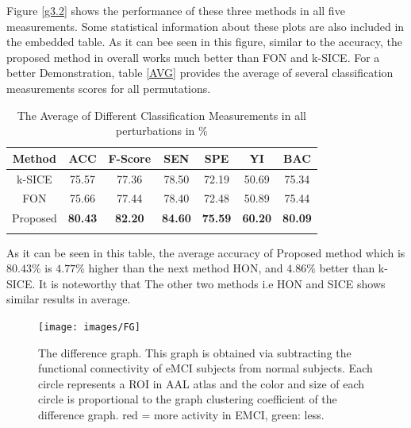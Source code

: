 \documentclass[preprint,12pt]{elsarticle}
\begin{document}
Figure \eqref{g3.2} shows the performance of these three methods in all five measurements. Some statistical information about these plots are also included in the embedded table. As it can bee seen in this figure, similar to the accuracy, the proposed method in overall works much better than FON and k-SICE. For a better Demonstration, table \eqref{AVG} provides the average of several classification measurements scores for all permutations. 
\begin{table}
	\begin{center}
		\caption{The Average of Different Classification Measurements in all perturbations in \% }
		\begin{tabular}{@{}c*{6}{c}}
			\hline\hline
			Method&ACC& F-Score&SEN & SPE &YI & BAC 
			\\
			\hline
			k-SICE  &75.57& 77.36 & 78.50 & 72.19 & 50.69 & 75.34 
			\\
			FON   &75.66& 77.44 & 78.40 & 72.48 & 50.89 & 75.44  
			\\
			Proposed &\textbf{80.43}& \textbf{82.20} & \textbf{84.60} & \textbf{75.59} & \textbf{60.20} & \textbf{80.09}
			
			\\
			
			\hline\hline
			\label{AVG}
		\end{tabular}
	\end{center}
\end{table}
As it can be seen in this table, the average accuracy of Proposed method which is $80.43 \%$ is $4.77\%$ higher than the next method HON, and $4.86 \%$ better than k-SICE. It is noteworthy that The other two methods i.e HON and SICE shows similar results in average.  

\begin{figure}
	\centering
	\texttt{[image: images/FG]}
	\caption{
		The difference graph. This graph is obtained via subtracting the functional connectivity of eMCI subjects from normal subjects. Each circle represents a ROI in AAL atlas and the color and size of each circle is proportional to the graph clustering coefficient of the difference graph. red = more activity in EMCI, green: less. 
	}
	\label{g3.3}
\end{figure}
\end{document}
